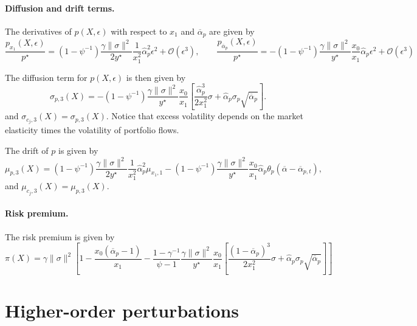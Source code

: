 \paragraph{Diffusion and drift terms.} The derivatives of $p(X,\epsilon)$ with respect to $x_1$ and $\overline{\alpha}_p$ are given by
\begin{equation}
    \frac{p_{x_1}(X,\epsilon)}{p^\star} = (1-\psi^{-1})\frac{\gamma\|\sigma\|^2}{2 y^\star} \frac{1}{x_1^2} \hat{\alpha}_p^2 \epsilon^2 + \mathcal{O}(\epsilon^3), \qquad  
    \frac{p_{\overline{\alpha}_p}(X,\epsilon)}{p^\star} = -(1-\psi^{-1}) \frac{\gamma\|\sigma\|^2}{y^\star} \frac{x_0}{x_1} \hat{\alpha}_p \epsilon^2 + \mathcal{O}(\epsilon^3)
\end{equation}

The diffusion term for $p(X,\epsilon)$ is then given by
\begin{equation}
    \sigma_{p,3}(X) =  -(1-\psi^{-1}) \frac{\gamma\|\sigma\|^2}{y^\star} \frac{x_0}{x_1} \left[   \frac{\hat{\alpha}_p^3}{2x_1^2} \sigma + \hat{\alpha}_p \sigma_p \sqrt{\overline{\alpha}_p} \right].
\end{equation}
and $\sigma_{c_j,3}(X) = \sigma_{p,3}(X)$. Notice that excess volatility depends on the market elasticity times the volatility of portfolio flows.

The drift of $p$ is given by
\begin{equation}
    \mu_{p,3}(X) = (1-\psi^{-1})\frac{\gamma\|\sigma\|^2}{2 y^\star} \frac{1}{x_1^2} \hat{\alpha}_p^2 \mu_{x_1,1} -(1-\psi^{-1}) \frac{\gamma\|\sigma\|^2}{y^\star} \frac{x_0}{x_1} \hat{\alpha}_p \theta_p (\overline{\alpha}-\overline{\alpha}_{p,t}),
\end{equation}
and $\mu_{c_j,3}(X) = \mu_{p,3}(X)$.

\paragraph{Risk premium.} The risk premium is given by
\begin{equation}
\pi(X) = \gamma \|\sigma\|^2 \left[ 1 - \frac{x_0(\overline{\alpha}_p -1) }{x_1}  -  \frac{1-\gamma^{-1}}{\psi-1} \frac{\gamma\|\sigma\|^2}{y^\star} \frac{x_0}{x_1} \left[   \frac{(1-\overline{\alpha}_p)^3}{2x_1^2} \sigma + \hat{\alpha}_p \sigma_p \sqrt{\overline{\alpha}_p} \right] \right]
\end{equation}

\section{Higher-order perturbations}


